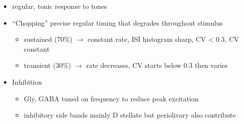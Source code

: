 \begin{itemize}
\item regular, tonic response to tones \citep{RhodeOertelEtAl:1983,SmithRhode:1989,BlackburnSachs:1989}
\item ``Chopping'' precise regular timing that degrades throughout stimulus\citep{YoungRobertEtAl:1988,BlackburnSachs:1989}
\begin{itemize}
\item sustained (70\%) $\rightarrow$ constant rate, ISI histogram sharp, CV < 0.3, CV constant
\item transient (30\%) $\rightarrow$ rate decreases, CV starts below 0.3 then varies
\end{itemize}
\item Inhibition
\begin{itemize}
\item Gly, GABA tuned on frequency to reduce peak excitation \citep{CasparyBackoffEtAl:1994}
\item inhibitory side bands mainly D stellate \citep{FerragamoGoldingEtAl:1998a} but periolivary also contribute \citep{AdamsWarr:1976,Adams:1983,ShoreHelfertEtAl:1991,OstapoffBensonEtAl:1997}
\end{itemize}
\end{itemize}
\citep{PalombiCaspary:1992,RhodeSmith:1986,NelkenYoung:1994,PaoliniClareyEtAl:2005,PaoliniClareyEtAl:2004}

